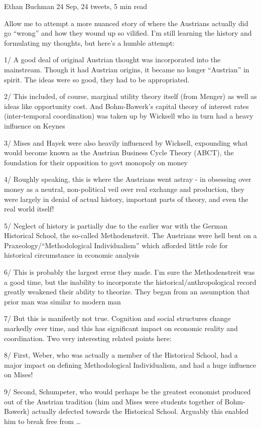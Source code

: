 \documentclass[
]{book}
\begin{document}
Ethan Buchman
24 Sep, 24 tweets, 5 min read

Allow me to attempt a more nuanced story of where the Austrians actually did go ``wrong'' and how they wound up so vilified. I'm still learning the history and formulating my thoughts, but here's a humble attempt:

1/ A good deal of original Austrian thought was incorporated into the mainstream. Though it had Austrian origins, it became no longer ``Austrian'' in spirit. The ideas were so good, they had to be appropriated.

2/ This included, of course, marginal utility theory itself (from Menger) as well as ideas like opportunity cost. And Bohm-Bawerk's capital theory of interest rates (inter-temporal coordination) was taken up by Wicksell who in turn had a heavy influence on Keynes

3/ Mises and Hayek were also heavily influenced by Wicksell, expounding what would become known as the Austrian Business Cycle Theory (ABCT), the foundation for their opposition to govt monopoly on money

4/ Roughly speaking, this is where the Austrians went astray - in obsessing over money as a neutral, non-political veil over real exchange and production, they were largely in denial of actual history, important parts of theory, and even the real world itself!

5/ Neglect of history is partially due to the earlier war with the German Historical School, the so-called Methodenstreit. The Austrians were hell bent on a Praxeology/``Methodological Individualism'' which afforded little role for historical circumstance in economic analysis

6/ This is probably the largest error they made. I'm sure the Methodenstreit was a good time, but the inability to incorporate the historical/anthropological record greatly weakened their ability to theorize. They began from an assumption that prior man was similar to modern man

7/ But this is manifestly not true. Cognition and social structures change markedly over time, and this has significant impact on economic reality and coordination. Two very interesting related points here:

8/ First, Weber, who was actually a member of the Historical School, had a major impact on defining Methodological Individualism, and had a huge influence on Mises!

9/ Second, Schumpeter, who would perhaps be the greatest economist produced out of the Austrian tradition (him and Mises were students together of Bohm-Bawerk) actually defected towards the Historical School. Arguably this enabled him to break free from \ldots{}
\end{document}
